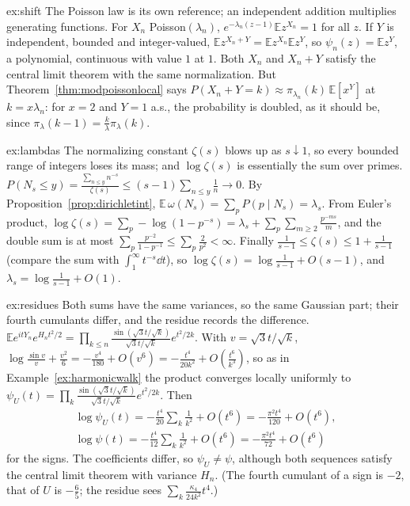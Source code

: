 \begin{solution}{ex:shift}
\idea The Poisson law is its own reference; an independent addition multiplies generating functions.
\writeup For $X_n$ Poisson$(\lambda_n)$, $e^{-\lambda_n(z-1)}\mathbb Ez^{X_n}=1$ for all $z$. If $Y$ is independent, bounded and integer-valued, $\mathbb Ez^{X_n+Y}=\mathbb Ez^{X_n}\mathbb Ez^Y$, so $\psi_n(z)=\mathbb Ez^Y$, a polynomial, continuous with value $1$ at $1$.
Both $X_n$ and $X_n+Y$ satisfy the central limit theorem with the same normalization. But Theorem~\ref{thm:modpoissonlocal} says $P(X_n+Y=k)\approx\pi_{\lambda_n}(k)\,\mathbb E[x^Y]$ at $k=x\lambda_n$: for $x=2$ and $Y=1$ a.s., the probability is doubled, as it should be,
since $\pi_\lambda(k-1)=\frac k\lambda\pi_\lambda(k)$.
\end{solution}

\begin{solution}{ex:lambdas}
\idea The normalizing constant $\zeta(s)$ blows up as $s\downarrow1$, so every bounded range of integers loses its mass; and $\log\zeta(s)$ is essentially the sum over primes.
\writeup $P(N_s\le y)=\frac{\sum_{n\le y}n^{-s}}{\zeta(s)}\le(s-1)\sum_{n\le y}\frac1n\to0$. By Proposition~\ref{prop:dirichletint}, $\mathbb E\,\omega(N_s)=\sum_pP(p\mid N_s)=\lambda_s$. From Euler's product,
$\log\zeta(s)=\sum_p-\log(1-p^{-s})=\lambda_s+\sum_p\sum_{m\ge2}\frac{p^{-ms}}m$, and the double sum is at most $\sum_p\frac{p^{-2}}{1-p^{-1}}\le\sum_p\frac2{p^2}<\infty$. Finally $\frac1{s-1}\le\zeta(s)\le1+\frac1{s-1}$ (compare the sum with $\int_1^\infty t^{-s}\dd t$),
so $\log\zeta(s)=\log\frac1{s-1}+O(s-1)$, and $\lambda_s=\log\frac1{s-1}+O(1)$.
\end{solution}

\begin{solution}{ex:residues}
\idea Both sums have the same variances, so the same Gaussian part; their fourth cumulants differ, and the residue records the difference.
\writeup $\mathbb Ee^{itY_n}e^{H_nt^2/2}=\prod_{k\le n}\frac{\sin(\sqrt3t/\sqrt k)}{\sqrt3t/\sqrt k}e^{t^2/2k}$. With $v=\sqrt3t/\sqrt k$, $\log\frac{\sin v}v+\frac{v^2}6=-\frac{v^4}{180}+O(v^6)=-\frac{t^4}{20k^2}+O(\frac{t^6}{k^3})$, so as in
Example~\ref{ex:harmonicwalk} the product converges locally uniformly to $\psi_U(t)=\prod_k\frac{\sin(\sqrt3t/\sqrt k)}{\sqrt3t/\sqrt k}e^{t^2/2k}$. Then
\[
\begin{gathered}
\log\psi_U(t)=-\frac{t^4}{20}\sum_k\frac1{k^2}+O(t^6)=-\frac{\pi^2t^4}{120}+O(t^6),\\\log\psi(t)=-\frac{t^4}{12}\sum_k\frac1{k^2}+O(t^6)=-\frac{\pi^2t^4}{72}+O(t^6)
\end{gathered}
\]
for the signs. The coefficients differ, so $\psi_U\neq\psi$, although both sequences satisfy the central limit theorem with variance $H_n$. (The fourth cumulant of a sign is $-2$, that of $U$ is $-\frac65$; the residue sees $\sum_k\frac{\kappa_4}{24k^2}t^4$.)
\end{solution}


